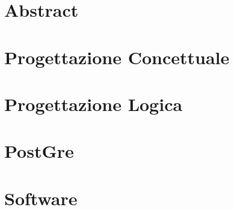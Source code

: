\section*{Abstract} %
\section*{Progettazione Concettuale}
\section*{Progettazione Logica}
\section*{PostGre}
\section*{Software}